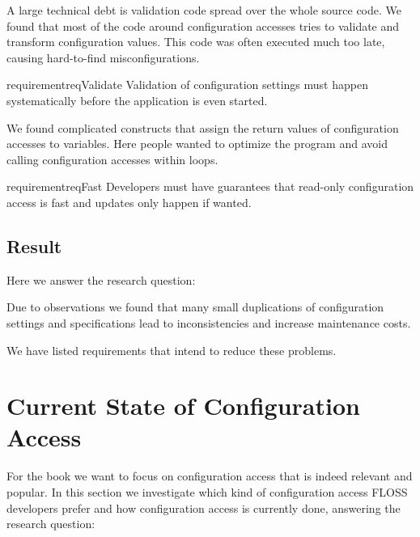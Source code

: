 A large technical debt is validation code spread over the whole source code.
We found that most of the code around configuration accesses tries to validate and transform configuration values.
This code was often executed much too late, causing hard-to-find misconfigurations.

\begin{restatable}{requirement}{reqValidate}
Validation of configuration settings must happen systematically before the application is even started.
\end{restatable}

We found complicated constructs that assign the return values of configuration accesses to variables.
Here people wanted to optimize the program and avoid calling configuration accesses within loops.

\begin{restatable}{requirement}{reqFast}
Developers must have guarantees that read-only configuration access is fast and updates only happen if wanted.%
\label{req:fast}
\end{restatable}

\subsection{Result}

Here we answer the research question:
\rqMotivationObservation*

\begin{finding}
Due to observations we found that many small duplications of configuration settings and specifications lead to inconsistencies and increase maintenance costs.
\end{finding}

We have listed requirements that intend to reduce these problems.

















\section{Current State of Configuration Access}
\label{sec:configuration-access}

For the book we want to focus on configuration access that is indeed relevant and popular.
In this section we investigate which kind of configuration access FLOSS developers prefer and how configuration access is currently done, answering the research question:
\rqMotivationCurrentState*

